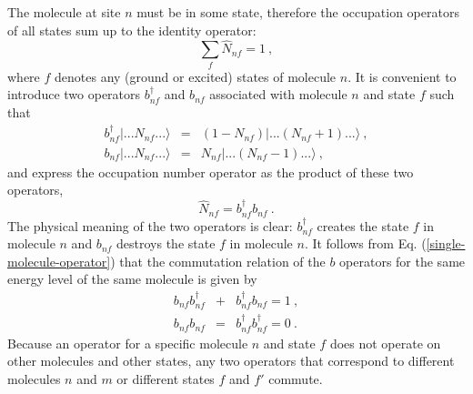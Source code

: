The molecule at site $n$ must be in some state, therefore the occupation operators of all states sum up to the identity
operator:
\begin{equation}
\sum_{f}\hat{N}_{nf} = 1 \ , \label{must-be-in-a-state}
\end{equation}
where $f$ denotes any (ground or excited) states  of molecule $n$. 
It is convenient to introduce two operators $b_{nf}^{\dagger}$ and $b_{nf}$ associated with molecule $n$ and state $f$ such that
\begin{eqnarray}
b_{nf}^{\dagger} |...N_{nf}...\rangle &=& (1-N_{nf})|...(N_{nf}+1)...\rangle \ , \nonumber \\
b_{nf} |...N_{nf}...\rangle &=& N_{nf}|...(N_{nf}-1)...\rangle \ , \label{single-molecule-operator}
\end{eqnarray}
and express the occupation number operator as the product of these two operators,
\begin{equation}
\hat{N}_{nf} =b_{nf}^{\dagger} b_{nf} \ .
\end{equation}
The physical meaning of the two operators is clear: $b_{nf}^{\dagger}$ creates the state $f$ in molecule $n$ and 
$b_{nf}$ destroys the state $f$ in molecule $n$.  It follows from Eq. (\ref{single-molecule-operator}) that the 
commutation relation of the $b$ operators for the same energy level of the same molecule is given by
\begin{eqnarray}
b_{nf}b_{nf}^{\dagger} &+& b_{nf}^{\dagger}b_{nf} = 1 \ , \nonumber \\
b_{nf}b_{nf}&=&b_{nf}^{\dagger}b_{nf}^{\dagger} =0 \ . \label{commutation-relation-single-molecule}
\end{eqnarray}
Because an operator for a specific molecule $n$ and state $f$ does not operate on other molecules and other states, any two operators that correspond to different molecules $n$ and $m$ or different states $f$ and $f'$ commute.

